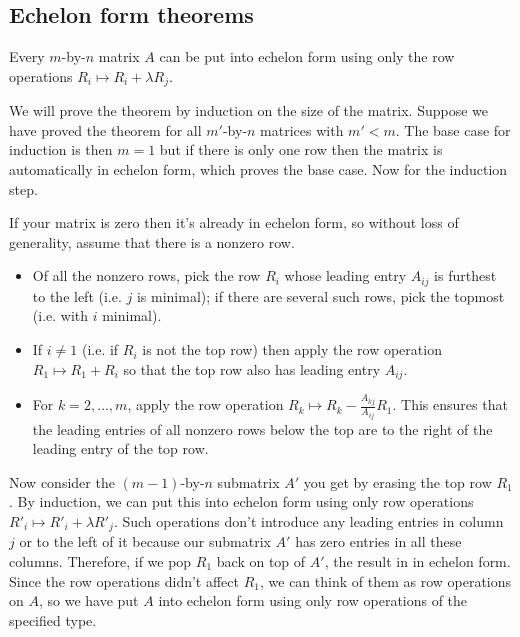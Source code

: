 \documentclass{article}
\begin{document}
\subsection{Echelon form theorems}


\begin{Theorem}\label{thm:echelonform}
Every \(m\)-by-\(n\) matrix \(A\) can be put into echelon form using
only the row operations \(R_i\mapsto R_i+\lambda R_j\).
\end{Theorem}
\begin{Proof}
We will prove the theorem by induction on the size of the
matrix. Suppose we have proved the theorem for all \(m'\)-by-\(n\)
matrices with \(m'<m\). The base case for induction is then \(m=1\)
but if there is only one row then the matrix is automatically in
echelon form, which proves the base case. Now for the induction
step.


If your matrix is zero then it's already in echelon form, so without
loss of generality, assume that there is a nonzero row.
\begin{itemize}
\item Of all the nonzero rows, pick the row \(R_i\) whose leading entry
\(A_{ij}\) is furthest to the left (i.e. \(j\) is minimal); if
there are several such rows, pick the topmost (i.e. with \(i\)
minimal).
\item If \(i\neq 1\) (i.e. if \(R_i\) is not the top row) then apply the
row operation \(R_1\mapsto R_1+R_i\) so that the top row also has
leading entry \(A_{ij}\).
\item For \(k=2,\ldots,m\), apply the row operation \(R_k\mapsto
R_k-\frac{A_{kj}}{A_{ij}}R_1\). This ensures that the leading
entries of all nonzero rows below the top are to the right of the
leading entry of the top row.
\end{itemize}
Now consider the \((m-1)\)-by-\(n\) submatrix \(A'\) you get by
erasing the top row \(R_1\). By induction, we can put this into
echelon form using only row operations \(R'_i\mapsto R'_i+\lambda
R'_j\). Such operations don't introduce any leading entries in
column \(j\) or to the left of it because our submatrix \(A'\) has
zero entries in all these columns. Therefore, if we pop \(R_1\) back
on top of \(A'\), the result in in echelon form. Since the row
operations didn't affect \(R_1\), we can think of them as row
operations on \(A\), so we have put \(A\) into echelon form using
only row operations of the specified type. \qedhere


\end{Proof}
\end{document}
